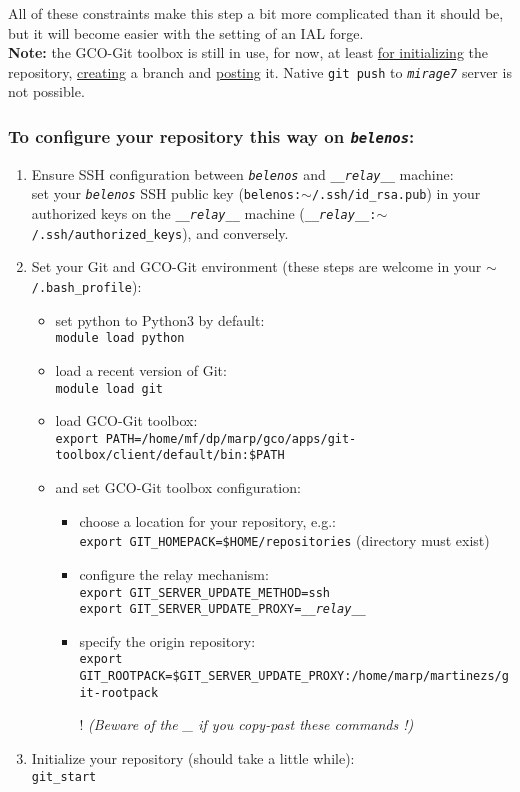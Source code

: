 \documentclass[a4paper,10pt,twoside]{article}
\begin{document}
All of these constraints make this step a bit more complicated than it should be, but it will become easier with the setting of an IAL forge.\\

\noindent \textbf{Note:} the GCO-Git toolbox is still in use, for now, at least \underline{for initializing} the repository, \underline{creating} a branch and \underline{posting} it. Native \texttt{git push} to \texttt{\textit{mirage7}} server is not possible.

\subsubsection*{To configure your repository this way on \texttt{\textit{belenos}}:}
\begin{enumerate}[label=(IAL.\arabic*)]
 \item Ensure SSH configuration between \textit{\texttt{belenos}} and \textit{\texttt{\_\_relay\_\_}} machine:\\
 set your \textit{\texttt{belenos}} SSH public key (\texttt{belenos:$\sim$/.ssh/id\_rsa.pub}) in your authorized keys on the \textit{\texttt{\_\_relay\_\_}} machine (\texttt{\textit{\_\_relay\_\_}:$\sim$/.ssh/authorized\_keys}), and conversely.
 \item Set your Git and GCO-Git environment (these steps are welcome in your \texttt{$\sim$/.bash\_profile}):
 \begin{itemize}
  \item set python to Python3 by default:\\
  \texttt{module load python}
  \item load a recent version of Git:\\
  \texttt{module load git}
  \item load GCO-Git toolbox:\\
  \texttt{export PATH=/home/mf/dp/marp/gco/apps/git-toolbox/client/default/bin:\$PATH}
  \item and set GCO-Git toolbox configuration:
  \begin{itemize}
   \item choose a location for your repository, e.g.:\\
   \texttt{export GIT\_HOMEPACK=\$HOME/repositories} (directory must exist)
   \item configure the relay mechanism:\\
   \texttt{export GIT\_SERVER\_UPDATE\_METHOD=ssh}\\
   \texttt{export GIT\_SERVER\_UPDATE\_PROXY=\textit{\_\_relay\_\_}}
   \item specify the origin repository:\\
   \texttt{export GIT\_ROOTPACK=\$GIT\_SERVER\_UPDATE\_PROXY:/home/marp/martinezs/git-rootpack}
   \item[!] \textit{(Beware of the \_ if you copy-past these commands !)}
  \end{itemize}
 \end{itemize}
 \item Initialize your repository (should take a little while):\\
 \texttt{git\_start}
\end{enumerate}
\end{document}
